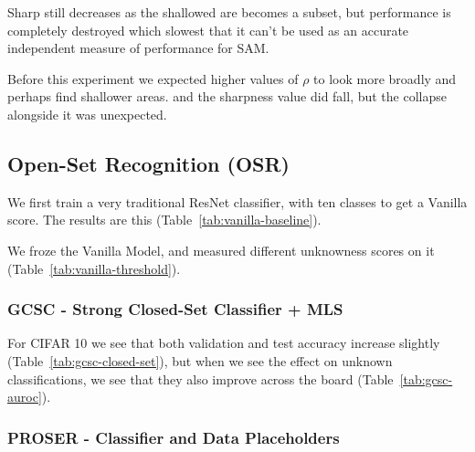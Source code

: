 \documentclass{article}
\begin{document}
Sharp still decreases as the shallowed are becomes a subset, but
performance is completely destroyed which slowest that it can't be used as an accurate independent measure of performance for SAM.

Before this experiment we expected higher values of $\rho$ to look more broadly and perhaps find shallower areas. and the sharpness value did fall, but the collapse alongside it was unexpected.
\subsection{Open-Set Recognition (OSR)}

We first train a very traditional ResNet classifier, with ten classes to get a Vanilla score. The results are this (Table~\ref{tab:vanilla-baseline}).


We froze the Vanilla Model, and measured different unknowness scores on it (Table~\ref{tab:vanilla-threshold}).


\subsubsection{GCSC - Strong Closed-Set Classifier + MLS}




For CIFAR 10 we see that both validation and test accuracy increase slightly (Table~\ref{tab:gcsc-closed-set}), but when we see the effect on unknown classifications, we see that they also improve across the board (Table~\ref{tab:gcsc-auroc}).


\subsubsection{PROSER - Classifier and Data Placeholders}



\end{document}
